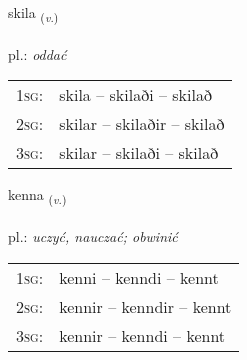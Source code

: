 \documentclass[frontgrid, backgrid]{flacards}\usepackage[]{graphicx}\usepackage[]{xcolor}
\begin{document}
\renewcommand{\flhead}{\vskip5pt \fboxsep=0pt {\small\bfseries\footnotesize Sagnorð | Verb}}
\renewcommand{\fcfoot}{\vskip5pt \fboxsep=0pt \hspace{2pt}{\small\bfseries\footnotesize 1K}}

\renewcommand{\blhead}{\vskip5pt {\small\bfseries\footnotesize Sagnorð | Verb }}
\renewcommand{\bcfoot}{\vskip5pt \hspace{2pt}{\small\bfseries\footnotesize 1K}}


{skila \small{\textsubscript{(\textit{v.})}} \\[1ex] %
\textphonetic{[scɪːla]} \\
pl.: \emph{oddać} \\  [2ex]
\renewcommand*{\arraystretch}{0.8}
\begin{tabular}{p{1cm}l}
\textsc{1sg}: & skila -- skilaði -- skilað \\ 
\textsc{2sg}: & skilar -- skilaðir -- skilað \\ 
\textsc{3sg}: & skilar -- skilaði -- skilað \\ 
\end{tabular}
}

\renewcommand{\flhead}{\vskip5pt \fboxsep=0pt {\small\bfseries\footnotesize Sagnorð | Verb}}
\renewcommand{\fcfoot}{\vskip5pt \fboxsep=0pt \hspace{2pt}{\small\bfseries\footnotesize 1K}}

\renewcommand{\blhead}{\vskip5pt {\small\bfseries\footnotesize Sagnorð | Verb }}
\renewcommand{\bcfoot}{\vskip5pt \hspace{2pt}{\small\bfseries\footnotesize 1K}}


{kenna \small{\textsubscript{(\textit{v.})}} \\[1ex] %
\textphonetic{[cʰɛna]} \\
pl.: \emph{uczyć, nauczać; obwinić} \\  [2ex]
\renewcommand*{\arraystretch}{0.8}
\begin{tabular}{p{1cm}l}
\textsc{1sg}: & kenni -- kenndi -- kennt \\ 
\textsc{2sg}: & kennir -- kenndir -- kennt \\ 
\textsc{3sg}: & kennir -- kenndi -- kennt \\ 
\end{tabular}
}
\end{document}
